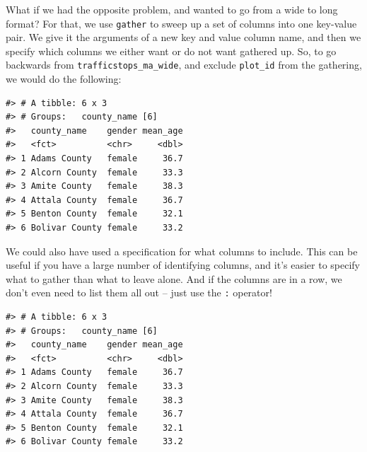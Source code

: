 \documentclass[]{book}
\newenvironment{Shaded}{\begin{snugshade}}{\end{snugshade}}
\newcommand{\KeywordTok}[1]{\textcolor[rgb]{0.13,0.29,0.53}{\textbf{#1}}}
\newcommand{\StringTok}[1]{\textcolor[rgb]{0.31,0.60,0.02}{#1}}
\newcommand{\OperatorTok}[1]{\textcolor[rgb]{0.81,0.36,0.00}{\textbf{#1}}}
\newcommand{\NormalTok}[1]{#1}
\theoremstyle{definition}
\theoremstyle{definition}
\theoremstyle{definition}
\theoremstyle{remark}
\begin{document}
What if we had the opposite problem, and wanted to go from a wide to
long format? For that, we use \texttt{gather} to sweep up a set of
columns into one key-value pair. We give it the arguments of a new key
and value column name, and then we specify which columns we either want
or do not want gathered up. So, to go backwards from
\texttt{trafficstops\_ma\_wide}, and exclude \texttt{plot\_id} from the
gathering, we would do the following:

\begin{Shaded}
\end{Shaded}

\begin{verbatim}
#> # A tibble: 6 x 3
#> # Groups:   county_name [6]
#>   county_name    gender mean_age
#>   <fct>          <chr>     <dbl>
#> 1 Adams County   female     36.7
#> 2 Alcorn County  female     33.3
#> 3 Amite County   female     38.3
#> 4 Attala County  female     36.7
#> 5 Benton County  female     32.1
#> 6 Bolivar County female     33.2
\end{verbatim}

We could also have used a specification for what columns to include.
This can be useful if you have a large number of identifying columns,
and it's easier to specify what to gather than what to leave alone. And
if the columns are in a row, we don't even need to list them all out --
just use the \texttt{:} operator!

\begin{Shaded}
\end{Shaded}

\begin{verbatim}
#> # A tibble: 6 x 3
#> # Groups:   county_name [6]
#>   county_name    gender mean_age
#>   <fct>          <chr>     <dbl>
#> 1 Adams County   female     36.7
#> 2 Alcorn County  female     33.3
#> 3 Amite County   female     38.3
#> 4 Attala County  female     36.7
#> 5 Benton County  female     32.1
#> 6 Bolivar County female     33.2
\end{verbatim}
\end{document}

